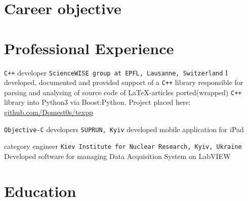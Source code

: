 \documentclass[11pt,a4paper,sans]{moderncv}
\begin{document}
\makecvtitle

\section{Career objective}


\section{Professional Experience}
	{\texttt{C++} developer}
	{\texttt{ScienceWISE group at EPFL, Lausanne, Switzerland}}
	{\newline I developed, documented and provided support of a \texttt{C++} library responsible for parsing and analysing of source code of \LaTeX -articles}
{\newline ported(wrapped) \texttt{C++} library into Python3 via Boost:Python.
\newline Project placed here: \url{github.com/Domest0s/texpp} }{}

	{\texttt{Objective-C} developers}
	{\texttt{SUPRUN, Kyiv}}
	{\newline developed mobile application for iPad}{}{}
	
	
	{ category engineer}
	{\texttt{Kiev Institute for Nuclear Research, Kyiv, Ukraine}}
	{\newline Developed software for managing Data Acquisition System on LabVIEW}{}{}






\section{Education}
\end{document}
